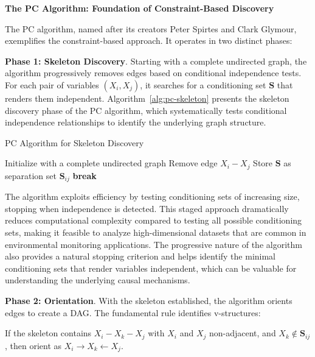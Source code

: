 \textbf{The PC Algorithm: Foundation of Constraint-Based Discovery}

The PC algorithm, named after its creators Peter Spirtes and Clark Glymour, exemplifies the constraint-based approach. It operates in two distinct phases:

\textbf{Phase 1: Skeleton Discovery}. Starting with a complete undirected graph, the algorithm progressively removes edges based on conditional independence tests. For each pair of variables $(X_i, X_j)$, it searches for a conditioning set $\mathbf{S}$ that renders them independent. Algorithm~\ref{alg:pc-skeleton} presents the skeleton discovery phase of the PC algorithm, which systematically tests conditional independence relationships to identify the underlying graph structure.

\begin{algorithm}[h!]
	\caption[PC Algorithm for Skeleton Discovery]{PC Algorithm for Skeleton Discovery}
	\label{alg:pc-skeleton}
	\BlankLine
	Initialize with a complete undirected graph\;
	{
		{
			{
				{
					Remove edge $X_i - X_j$\;
					Store $\mathbf{S}$ as separation set $\mathbf{S}_{ij}$\;
					\textbf{break}\;
				}
			}
		}
	}
\end{algorithm}

The algorithm exploits efficiency by testing conditioning sets of increasing size, stopping when independence is detected. This staged approach dramatically reduces computational complexity compared to testing all possible conditioning sets, making it feasible to analyze high-dimensional datasets that are common in environmental monitoring applications. The progressive nature of the algorithm also provides a natural stopping criterion and helps identify the minimal conditioning sets that render variables independent, which can be valuable for understanding the underlying causal mechanisms.

\textbf{Phase 2: Orientation}. With the skeleton established, the algorithm orients edges to create a DAG. The fundamental rule identifies v-structures:

If the skeleton contains $X_i - X_k - X_j$ with $X_i$ and $X_j$ non-adjacent, and $X_k \notin \mathbf{S}_{ij}$, then orient as $X_i \rightarrow X_k \leftarrow X_j$.

